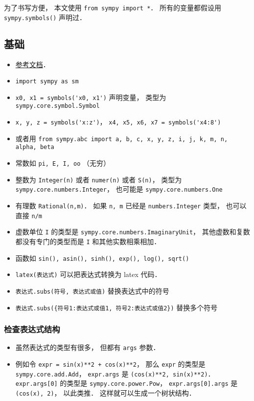 
\begin{issues}
\issueDraft
\end{issues}


为了书写方便， 本文使用 \verb|from sympy import *|． 所有的变量都假设用 \verb|sympy.symbols()| 声明过．

\subsection{基础}
\begin{itemize}
\item \href{https://docs.sympy.org/latest/reference/index.html}{参考文档}．
\item \verb|import sympy as sm|
\item \verb|x0, x1 = symbols('x0, x1')| 声明变量， 类型为 \verb|sympy.core.symbol.Symbol|
\item \verb|x, y, z = symbols('x:z')|， \verb|x4, x5, x6, x7 = symbols('x4:8')|
\item 或者用 \verb|from sympy.abc import a, b, c, x, y, z, i, j, k, m, n, alpha, beta|
\item 常数如 \verb|pi, E, I, oo| （无穷）
\item 整数为 \verb|Integer(n)| 或者 \verb|numer(n)| 或者 \verb|S(n)|， 类型为 \verb|sympy.core.numbers.Integer|， 也可能是 \verb|sympy.core.numbers.One|
\item 有理数 \verb|Rational(n,m)|． 如果 \verb|n, m| 已经是 \verb|numbers.Integer| 类型， 也可以直接 \verb|n/m|
\item 虚数单位 \verb|I| 的类型是 \verb|sympy.core.numbers.ImaginaryUnit|， 其他虚数和复数都没有专门的类型而是 \verb|I| 和其他实数相乘相加．
\item 函数如 \verb|sin(), asin(), sinh(), exp(), log(), sqrt()|
\item \verb|latex(表达式)| 可以把表达式转换为 latex 代码．
\item \verb|表达式.subs(符号, 表达式或值)| 替换表达式中的符号
\item \verb|表达式.subs({符号1:表达式或值1, 符号2:表达式或值2})| 替换多个符号
\end{itemize}

\subsubsection{检查表达式结构}
\begin{itemize}
\item 虽然表达式的类型有很多， 但都有 \verb|args| 参数．
\item 例如令 \verb|expr = sin(x)**2 + cos(x)**2|， 那么 \verb|expr| 的类型是 \verb|sympy.core.add.Add|， \verb|expr.args| 是 \verb|(cos(x)**2, sin(x)**2)|． \verb|expr.args[0]| 的类型是 \verb|sympy.core.power.Pow|， \verb|expr.args[0].args| 是 \verb|(cos(x), 2)|， 以此类推． 这样就可以生成一个树状结构．
\end{itemize}


